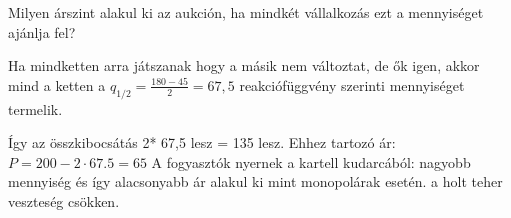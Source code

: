 \documentclass[10pt,a4paper]{article}
\begin{document}
\begin{enumerate}[label=(\alph*)]



Milyen árszint alakul ki az aukción, ha mindkét vállalkozás ezt a mennyiséget ajánlja fel?

Ha mindketten arra játszanak hogy a másik nem változtat, de ők igen, akkor mind a ketten a $q_{1/2} = \displaystyle\frac{180-45}{2} = 67,5$ reakciófüggvény szerinti mennyiséget termelik.

Így az összkibocsátás 2* 67,5 lesz = 135 lesz. Ehhez tartozó ár: $P = 200-2 \cdot 67.5 = 65$ 
A fogyasztók nyernek a kartell kudarcából: nagyobb mennyiség és így alacsonyabb ár alakul ki mint monopolárak esetén. a holt teher veszteség csökken.




\end{enumerate}
\end{document}
